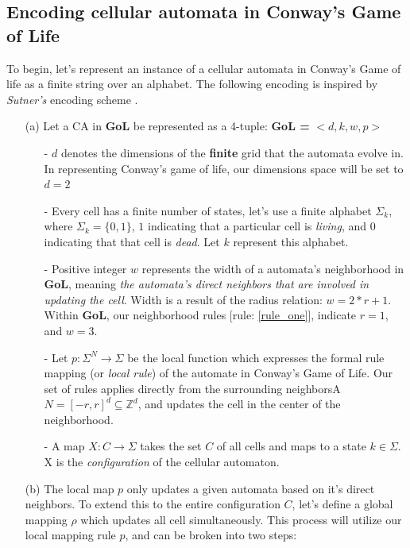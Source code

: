 \documentclass{article}
\theoremstyle{definition}
\theoremstyle{plain}
\theoremstyle{plain}
\begin{document}
\subsection{Encoding cellular automata in Conway's Game of Life}
To begin, let's represent an instance of a cellular automata in Conway's Game of life as a finite string over an alphabet. The following encoding is inspired by \textit{Sutner's} encoding scheme \cite{SUTNER199587}.
\begin{enumerate}
  \item[(a)] Let a CA in \textbf{GoL} be represented as a 4-tuple: \textbf{GoL = } $ <d, k, w, p> $ \label{gol}
    \begin{enumerate}
      \item[-] $d$ denotes the dimensions of the \textbf{finite} grid that the automata evolve in. In representing Conway's game of life, our dimensions space will be set to $d = 2$
      \item[-] Every cell has a finite number of states, let's use a finite alphabet $\Sigma_k$, where $\Sigma_k = \{0,1\}$, $1$ indicating that a particular cell is \textit{living}, and $0$ indicating that that cell is \textit{dead}. Let $k$ represent this alphabet.
      \item[-] Positive integer $w$ represents the width of a automata's neighborhood in \textbf{GoL}, meaning \textit{the automata's direct neighbors that are involved in updating the cell}. Width is a result of the radius relation: $w = 2*r +1$. Within \textbf{GoL}, our neighborhood rules [rule: \ref{rule_one}], indicate $r = 1$, and $w = 3$.
      \item[-] Let $p : \Sigma^N \to \Sigma$ be the local function which expresses the formal rule mapping (or \textit{local rule}) of the automate in Conway's Game of Life. Our set of rules applies directly from the surrounding neighborsA $ N = [-r, r]^d \subseteq \mathbb{Z}^d $, and updates the cell in the center of the neighborhood.
      \item[-] A map $ X : C \to \Sigma $ takes the set $ C $ of all cells and maps to a state $ k \in \Sigma$. X is the \emph{configuration} of the cellular automaton.
    \end{enumerate}
      \item[(b)] The local map $p$ only updates a given automata based on it's direct neighbors. To extend this to the entire configuration $C$, let's define a global mapping $\rho$ which updates all cell simultaneously. This process will utilize our local mapping rule $p$, and  can be broken into two steps: 

\end{enumerate}
\end{document}
